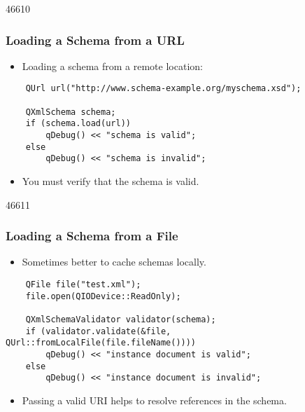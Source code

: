 \begin{slide}[fragile]{46610}
\frametitle{Loading a Schema from a URL}

\begin{itemize}
\item Loading a schema from a remote location:
\end{itemize}

\begin{lstlisting}
    QUrl url("http://www.schema-example.org/myschema.xsd");

    QXmlSchema schema;
    if (schema.load(url))
        qDebug() << "schema is valid";
    else
        qDebug() << "schema is invalid";
\end{lstlisting}

\begin{itemize}
\item You must verify that the schema is valid.
\end{itemize}

\end{slide}

\begin{slide}[fragile]{46611}
\frametitle{Loading a Schema from a File}

\begin{itemize}
\item Sometimes better to cache schemas locally.
\end{itemize}

\begin{lstlisting}
    QFile file("test.xml");
    file.open(QIODevice::ReadOnly);

    QXmlSchemaValidator validator(schema);
    if (validator.validate(&file, QUrl::fromLocalFile(file.fileName())))
        qDebug() << "instance document is valid";
    else
        qDebug() << "instance document is invalid";
\end{lstlisting}

\begin{itemize}
\item Passing a valid URI helps to resolve references in the schema.
\end{itemize}

\end{slide}


